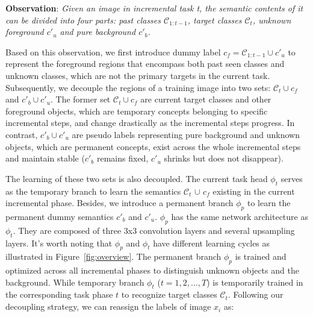 \textbf{Observation}: \textit{Given an image in incremental task t, the semantic contents of it can be divided into four parts: past classes \(\mathcal{C}_{1:t-1}\), target classes \(\mathcal{C}_{t}\), unknown foreground \(c'_u\) and pure background \(c'_b\).}

Based on this observation, we first introduce dummy label \(c_f=\mathcal{C}_{1:t-1} \cup c'_u\) to represent the foreground regions that encompass both past seen classes and unknown classes, which are not the primary targets in the current task. Subsequently, we decouple the regions of a training image into two sets: \( \mathcal{C}_t  \cup  c_f\) and \( c'_b \cup c'_u \). The former set  \( \mathcal{C}_t  \cup  c_f\) are current target classes and other foreground objects, which are temporary concepts belonging to specific incremental steps, and change drastically as the incremental steps progress. In contrast, \( c'_b \cup c'_u \) are pseudo labels representing pure background and unknown objects, which are permanent concepts, exist across the whole incremental steps and maintain stable (\( c'_b \) remains fixed, \( c'_u \) shrinks but does not disappear). 

The learning of these two sets is also decoupled. The current task head \(\phi_t\) serves as the temporary branch to learn the semantics \( \mathcal{C}_t \) $\cup$ \( c_f \) existing in the current incremental phase. Besides, we introduce a permanent branch \(\phi_p\) to learn the permanent dummy semantics \( c'_b \) and \( c'_u \). \(\phi_p\) has the same network architecture as \(\phi_{t}\). They are composed of three 3x3 convolution layers and several upsampling layers. It's worth noting that $\phi_p$ and $\phi_t$  have different learning cycles as illustrated in Figure~\ref{fig:overview}. The permanent branch $\phi_p$ is trained and optimized across all incremental phases to distinguish unknown objects and the background. While temporary branch $\phi_t$ ($t=1,2,...,T$) is temporarily trained in the corresponding task phase $t$ to recognize target classes $\mathcal{C}_t$.
Following our decoupling strategy, we can reassign the labels of image \( x_i \) as:

